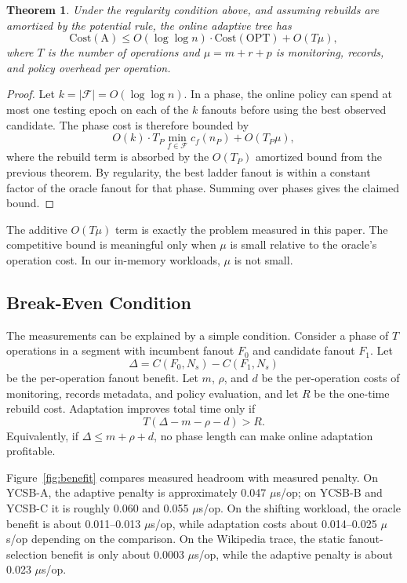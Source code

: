 \documentclass[sigconf,screen]{acmart}
\newtheorem{theorem}{Theorem}
\newcommand{\us}{\(\mu\)s\xspace}
\begin{document}
\begin{theorem}
Under the regularity condition above, and assuming rebuilds are amortized by
the potential rule, the online adaptive tree has
\[
  \mathrm{Cost}(\mathrm{A})
  \le O(\log\log n)\cdot \mathrm{Cost}(\mathrm{OPT}) + O(T\mu),
\]
where \(T\) is the number of operations and
\(\mu=m+r+p\) is monitoring, records, and policy overhead per operation.
\end{theorem}

\begin{proof}
Let \(k=|\mathcal{F}|=O(\log\log n)\).  In a phase, the online policy can
spend at most one testing epoch on each of the \(k\) fanouts before using the
best observed candidate.  The phase cost is therefore bounded by
\[
  O(k)\cdot T_P \min_{f\in\mathcal{F}} c_f(n_P) + O(T_P\mu),
\]
where the rebuild term is absorbed by the \(O(T_P)\) amortized bound from the
previous theorem.  By regularity, the best ladder fanout is within a constant
factor of the oracle fanout for that phase.  Summing over phases gives the
claimed bound.
\end{proof}

The additive \(O(T\mu)\) term is exactly the problem measured in this paper.
The competitive bound is meaningful only when \(\mu\) is small relative to the
oracle's operation cost.  In our in-memory workloads, \(\mu\) is not small.

\subsection{Break-Even Condition}

The measurements can be explained by a simple condition.  Consider a phase of
\(T\) operations in a segment with incumbent fanout \(F_0\) and candidate
fanout \(F_1\).  Let
\[
  \Delta = C(F_0,N_s)-C(F_1,N_s)
\]
be the per-operation fanout benefit.  Let \(m\), \(\rho\), and \(d\) be the
per-operation costs of monitoring, records metadata, and policy evaluation,
and let \(R\) be the one-time rebuild cost.  Adaptation improves total time
only if
\[
  T(\Delta - m - \rho - d) > R.
\]
Equivalently, if \(\Delta \le m+\rho+d\), no phase length can make online
adaptation profitable.

Figure~\ref{fig:benefit} compares measured headroom with measured penalty.  On
YCSB-A, the adaptive penalty is approximately 0.047 \us/op; on YCSB-B and
YCSB-C it is roughly 0.060 and 0.055 \us/op.  On the shifting workload, the
oracle benefit is about 0.011--0.013 \us/op, while adaptation costs about
0.014--0.025 \us/op depending on the comparison.  On the Wikipedia trace, the
static fanout-selection benefit is only about 0.0003 \us/op, while the adaptive
penalty is about 0.023 \us/op.
\end{document}
